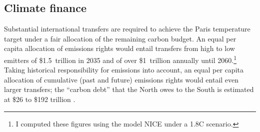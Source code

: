 \documentclass[12pt,english]{article}
\begin{document}

\subsection{Climate finance\label{subsubsec:finance}}

Substantial international transfers are required to achieve the Paris temperature target under a fair allocation of %
the remaining carbon budget. %
An equal per capita allocation of emissions rights %
would entail transfers 
from high to low emitters of \$1.5~trillion in 2035 and of over \$1~trillion annually until 2060.\footnote{I computed these figures using the model NICE under a 1.8\textdegree{}C scenario.} %
Taking historical responsibility for emissions into account, an equal per capita allocation of cumulative (past and future) emissions rights would entail even larger transfers; the ``carbon debt'' that the North owes to the South is estimated at \$26 to \$192 trillion \citep{fabre_global_2024,fanning_compensation_2023}. 
\end{document}
